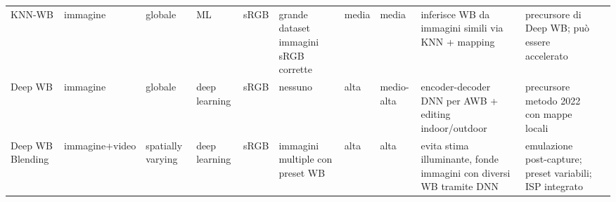 \begin{table}[ht]
{\begin{tabular}{l|llllllllll}
KNN-WB & immagine & globale & ML & sRGB & grande dataset immagini sRGB corrette & media & media & inferisce WB da immagini simili via KNN + mapping & precursore di Deep WB; può essere accelerato & \cite{afifi_deep_2020} \\
Deep WB & immagine & globale & deep learning & sRGB & nessuno & alta & medio-alta & encoder-decoder DNN per AWB + editing indoor/outdoor & precursore metodo 2022 con mappe locali & \cite{afifi_deep_2020} \\
Deep WB Blending & immagine+video & spatially varying & deep learning & sRGB & immagini multiple con preset WB & alta & alta & evita stima illuminante, fonde immagini con diversi WB tramite DNN & emulazione post-capture; preset variabili; ISP integrato & \cite{afifi_auto_2022} \\
\bottomrule
\end{tabular}
}
\label{tab:algorithms}
\end{table}
